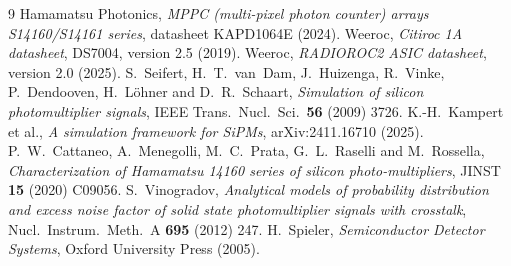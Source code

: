 \documentclass[11pt]{article}
\begin{document}
\begin{thebibliography}{9}
 Hamamatsu Photonics, \emph{MPPC (multi-pixel photon counter)
  arrays S14160/S14161 series}, datasheet KAPD1064E (2024).
 Weeroc, \emph{Citiroc 1A datasheet}, DS7004, version 2.5
  (2019).
 Weeroc, \emph{RADIOROC2 ASIC datasheet}, version 2.0
  (2025).
 S.~Seifert, H.~T.~van~Dam, J.~Huizenga, R.~Vinke,
  P.~Dendooven, H.~L\"ohner and D.~R.~Schaart, \emph{Simulation of silicon
  photomultiplier signals}, IEEE Trans.\ Nucl.\ Sci.\ \textbf{56} (2009) 3726.
 K.-H.~Kampert et al., \emph{A simulation framework for
  SiPMs}, arXiv:2411.16710 (2025).
 P.~W.~Cattaneo, A.~Menegolli, M.~C.~Prata, G.~L.~Raselli
  and M.~Rossella, \emph{Characterization of Hamamatsu 14160 series of
  silicon photo-multipliers}, JINST \textbf{15} (2020) C09056.
 S.~Vinogradov, \emph{Analytical models of probability
  distribution and excess noise factor of solid state photomultiplier
  signals with crosstalk}, Nucl.\ Instrum.\ Meth.\ A \textbf{695} (2012) 247.
 H.~Spieler, \emph{Semiconductor Detector Systems}, Oxford
  University Press (2005).
\end{thebibliography}
\end{document}
